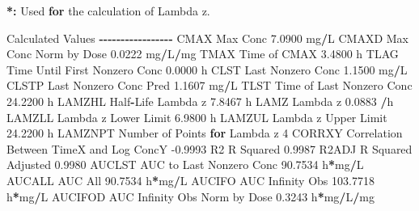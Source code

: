 \documentclass[
  12pt,
]{krantz}
\newenvironment{Shaded}{\begin{snugshade}}{\end{snugshade}}
\newcommand{\ControlFlowTok}[1]{\textcolor[rgb]{0.13,0.29,0.53}{\textbf{#1}}}
\newcommand{\DecValTok}[1]{\textcolor[rgb]{0.00,0.00,0.81}{#1}}
\newcommand{\ErrorTok}[1]{\textcolor[rgb]{0.64,0.00,0.00}{\textbf{#1}}}
\newcommand{\FloatTok}[1]{\textcolor[rgb]{0.00,0.00,0.81}{#1}}
\newcommand{\NormalTok}[1]{#1}
\newcommand{\OperatorTok}[1]{\textcolor[rgb]{0.81,0.36,0.00}{\textbf{#1}}}
\newcommand{\StringTok}[1]{\textcolor[rgb]{0.31,0.60,0.02}{#1}}
\begin{document}
\begin{Shaded}
\begin{Highlighting}[]
\OperatorTok{*}\ErrorTok{:}\StringTok{ }\NormalTok{Used }\ControlFlowTok{for}\NormalTok{ the calculation of Lambda z.}


\NormalTok{Calculated Values}
\OperatorTok{{-}{-}{-}{-}{-}{-}{-}{-}{-}{-}{-}{-}{-}{-}{-}{-}{-}}
\NormalTok{CMAX       Max Conc                                        }\FloatTok{7.0900}\NormalTok{ mg}\OperatorTok{/}\NormalTok{L}
\NormalTok{CMAXD      Max Conc Norm by Dose                           }\FloatTok{0.0222}\NormalTok{ mg}\OperatorTok{/}\NormalTok{L}\OperatorTok{/}\NormalTok{mg}
\NormalTok{TMAX       Time of CMAX                                    }\FloatTok{3.4800}\NormalTok{ h}
\NormalTok{TLAG       Time Until First Nonzero Conc                   }\FloatTok{0.0000}\NormalTok{ h}
\NormalTok{CLST       Last Nonzero Conc                               }\FloatTok{1.1500}\NormalTok{ mg}\OperatorTok{/}\NormalTok{L}
\NormalTok{CLSTP      Last Nonzero Conc Pred                          }\FloatTok{1.1607}\NormalTok{ mg}\OperatorTok{/}\NormalTok{L}
\NormalTok{TLST       Time of Last Nonzero Conc                      }\FloatTok{24.2200}\NormalTok{ h}
\NormalTok{LAMZHL     Half}\OperatorTok{{-}}\NormalTok{Life Lambda z                              }\FloatTok{7.8467}\NormalTok{ h}
\NormalTok{LAMZ       Lambda z                                        }\FloatTok{0.0883} \OperatorTok{/}\NormalTok{h}
\NormalTok{LAMZLL     Lambda z Lower Limit                            }\FloatTok{6.9800}\NormalTok{ h}
\NormalTok{LAMZUL     Lambda z Upper Limit                           }\FloatTok{24.2200}\NormalTok{ h}
\NormalTok{LAMZNPT    Number of Points }\ControlFlowTok{for}\NormalTok{ Lambda z                   }\DecValTok{4}
\NormalTok{CORRXY     Correlation Between TimeX and Log ConcY        }\FloatTok{{-}0.9993} 
\NormalTok{R2         R Squared                                       }\FloatTok{0.9987} 
\NormalTok{R2ADJ      R Squared Adjusted                              }\FloatTok{0.9980} 
\NormalTok{AUCLST     AUC to Last Nonzero Conc                       }\FloatTok{90.7534}\NormalTok{ h}\OperatorTok{*}\NormalTok{mg}\OperatorTok{/}\NormalTok{L}
\NormalTok{AUCALL     AUC All                                        }\FloatTok{90.7534}\NormalTok{ h}\OperatorTok{*}\NormalTok{mg}\OperatorTok{/}\NormalTok{L}
\NormalTok{AUCIFO     AUC Infinity Obs                              }\FloatTok{103.7718}\NormalTok{ h}\OperatorTok{*}\NormalTok{mg}\OperatorTok{/}\NormalTok{L}
\NormalTok{AUCIFOD    AUC Infinity Obs Norm by Dose                   }\FloatTok{0.3243}\NormalTok{ h}\OperatorTok{*}\NormalTok{mg}\OperatorTok{/}\NormalTok{L}\OperatorTok{/}\NormalTok{mg}

\end{Highlighting}
\end{Shaded}
\end{document}
